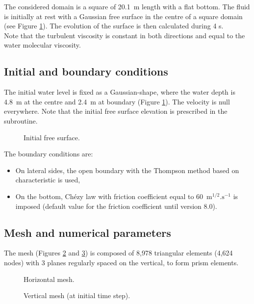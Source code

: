 \bigskip
The considered domain is a square of 20.1~m length with a flat bottom. 
The fluid is initially at rest with a Gaussian free surface in the 
centre of a square domain (see Figure \ref{t3d:thomson:fig:initial}).
The evolution of the surface is then calculated during 4 s.\\
Note that the turbulent viscosity is constant in both directions 
and equal to the water molecular viscosity.

\subsection{Initial and boundary conditions}
\bigskip
The initial water level is fixed as a Gaussian-shape, where the water depth 
is 4.8~m at the centre and 2.4~m at boundary 
(Figure \ref{t3d:thomson:fig:initial}). The velocity is null everywhere.
Note that the initial free surface elevation is prescribed in 
the  subroutine.

\begin{figure}[!htbp]
 \centering
\caption{Initial free surface.}
 \label{t3d:thomson:fig:initial}
\end{figure}

\bigskip
The boundary conditions are:
\begin{itemize}
\item On lateral sides, the open boundary with the Thompson method 
based on characteristic is used,
\item On the bottom, Chézy law with friction coefficient equal to 
60~$\text{m}^{1/2}.\text{s}^{-1}$ is imposed (default value
for the friction coefficient until version 8.0).
\end{itemize}

\subsection{Mesh and numerical parameters}

\bigskip
The mesh (Figures \ref{t3d:thomson:fig:meshH} and \ref{t3d:thomson:fig:meshV})  
is composed of 8,978 triangular elements (4,624 nodes) with 3 planes  
regularly spaced on the vertical, to form prism elements.

\begin{figure}[!htbp]
 \centering
 \caption{Horizontal mesh.}
 \label{t3d:thomson:fig:meshH}
\end{figure}
\begin{figure}[!htbp]
 \centering
 \caption{Vertical mesh (at initial time step).}
 \label{t3d:thomson:fig:meshV}
\end{figure}


